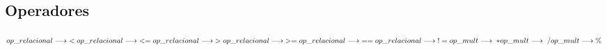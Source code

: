 \subsection{Operadores}

\begin{math}
    op\_relacional \longrightarrow \; < \\
    op\_relacional \longrightarrow \; <= \\
    op\_relacional \longrightarrow \; > \\
    op\_relacional \longrightarrow \; >= \\
    op\_relacional \longrightarrow \; == \\
    op\_relacional \longrightarrow \; != \\
    op\_mult \longrightarrow \; * \\
    op\_mult \longrightarrow \; / \\
    op\_mult \longrightarrow \% \\
\end{math}